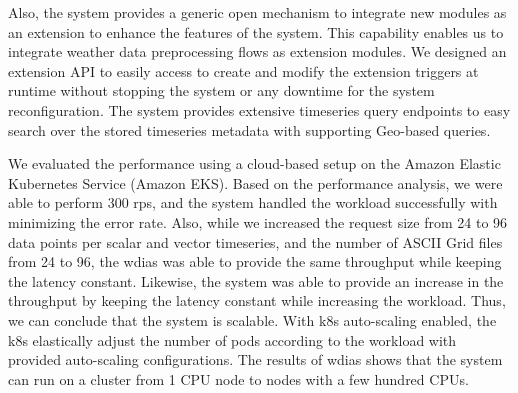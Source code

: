 Also, the system provides a generic open mechanism to integrate new modules as an extension to enhance the features of the system. This capability enables us to integrate weather data preprocessing flows as extension modules.
We designed an extension API to easily access to create and modify the extension triggers at runtime without stopping the system or any downtime for the system reconfiguration. The system provides extensive timeseries query endpoints to easy search over the stored timeseries metadata with supporting Geo-based queries.

We evaluated the performance using a cloud-based setup on the Amazon Elastic Kubernetes Service (Amazon EKS). %
Based on the performance analysis, we were able to perform 300 \acrshort{rps}, and the system handled the workload successfully with minimizing the error rate. Also, while we increased the request size from 24 to 96 data points per scalar and vector timeseries, and the number of ASCII Grid files from 24 to 96, the \acrshort{wdias} was able to provide the same throughput while keeping the latency constant. Likewise, the system was able to provide an increase in the throughput by keeping the latency constant while increasing the workload. Thus, we can conclude that the system is scalable. With \acrshort{k8s} auto-scaling enabled, the \acrshort{k8s} elastically adjust the number of pods according to the workload with provided auto-scaling configurations. The results of \acrshort{wdias} shows that the system can run on a cluster from 1 CPU node to nodes with a few hundred CPUs.
